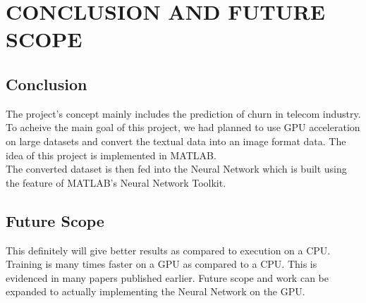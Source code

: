 

\chapter{CONCLUSION AND FUTURE SCOPE}
\section{Conclusion}
\hspace{0.9cm} The project's concept mainly includes the prediction of churn in telecom industry. To acheive the main goal of this project, we had planned to use GPU acceleration on large datasets and convert the textual data into an image format data. The idea of this project is implemented in MATLAB.\\ The converted dataset is then fed into the Neural Network which is built using the feature of MATLAB's Neural Network Toolkit.

\section{Future Scope}
\hspace{0.9cm} This definitely will give better results as compared to execution on a CPU. Training is many times faster on a GPU as compared to a CPU. This is evidenced in many papers published earlier. Future scope and work can be expanded to actually implementing the Neural Network on the GPU.